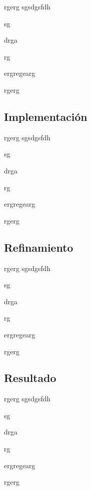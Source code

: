 rgerg
sgsdgsfdh

sg

drga

rg

ergregearg

rgerg

\subsection{Implementación}

rgerg
sgsdgsfdh

sg

drga

rg

ergregearg

rgerg

\subsection{Refinamiento}

rgerg
sgsdgsfdh

sg

drga

rg

ergregearg

rgerg

\subsection{Resultado}

rgerg
sgsdgsfdh

sg

drga

rg

ergregearg

rgerg
